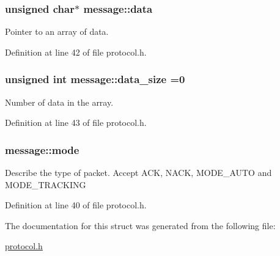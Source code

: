 \subsubsection[{data}]{\setlength{\rightskip}{0pt plus 5cm}unsigned char$\ast$ message\+::data}\label{structmessage_a56cfb15f3cbc41b9b8e5e0ba34d6bea4}


Pointer to an array of data. 



Definition at line 42 of file protocol.\+h.

\hypertarget{structmessage_a3a17f9f2aa68b473300ae38d4bad06e8}{}
\subsubsection[{data\+\_\+size}]{\setlength{\rightskip}{0pt plus 5cm}unsigned int message\+::data\+\_\+size =0}\label{structmessage_a3a17f9f2aa68b473300ae38d4bad06e8}


Number of data in the array. 



Definition at line 43 of file protocol.\+h.

\hypertarget{structmessage_a09bed901f53052cc020ab6ec8d64e3ee}{}
\subsubsection[{mode}]{ message\+::mode}\label{structmessage_a09bed901f53052cc020ab6ec8d64e3ee}
Describe the type of packet. Accept A\+C\+K, N\+A\+C\+K, M\+O\+D\+E\+\_\+\+A\+U\+T\+O and M\+O\+D\+E\+\_\+\+T\+R\+A\+C\+K\+I\+N\+G 

Definition at line 40 of file protocol.\+h.



The documentation for this struct was generated from the following file\+:\begin{DoxyCompactItemize}
\item 
\hyperlink{protocol_8h}{protocol.\+h}\end{DoxyCompactItemize}
